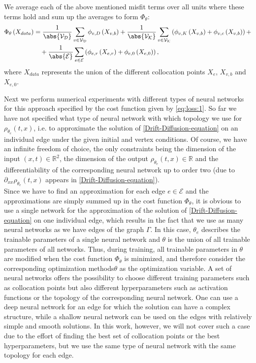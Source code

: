 We average each of the above mentioned misfit terms over all units where these terms hold and sum up the averages to form $\Phi_\theta$:
\begin{align} 
    \label{eq:loss:1}
    \Phi_{\theta} \left( X_{data} \right) & =  \frac{1}{\abs{\mathcal{V}_\mathcal{D}}} \sum_{v \in \mathcal{V}_\mathcal{D}} \phi_{v,D} \left( X_{v,b} \right) + \frac{1}{\abs{\mathcal{V}_\mathcal{K}}} \sum_{v \in \mathcal{V}_\mathcal{K}}  \left(  \phi_{v,K}  \left( X_{v,b} \right) + \phi_{v,c} \left( X_{v,b} \right)  \right) + \\
    & \quad + \frac{1}{\abs{\mathcal{E}}} \sum_{e \in \mathcal{E}}  \left(  \phi_{e,r}  \left( X_{e,r} \right) + \phi_{e,0}  \left( X_{e,0} \right)  \right), 
\end{align}
where $X_{data}$ represents the union of the different collocation points $X_e$, $X_{v,b}$ and $X_{e,0}$. 

Next we perform numerical experiments with different types of neural networks for this approach specified by the cost function given by \cref{eq:loss:1}. So far we have not specified what type of neural network with which topology we use for $\rho_{\theta_e}(t, x)$, i.e. to approximate the solution of \cref{Drift-Diffusion-equation} on an individual edge under the given initial and vertex conditions. Of course, we have an infinite freedom of choice, the only constraints being the dimension of the input $(x,t) \in \mathbb{R}^2$, the dimension of the output $\rho_{\theta_e}(t, x) \in \mathbb{R}$ and the differentiability of the corresponding neural network up to order two (due to $\partial_{xx} \rho_{\theta_e}(t,x)$ appears in \cref{Drift-Diffusion-equation}). \\
Since we have to find an approximation for each edge $e \in \mathcal{E}$ and the approximations are simply summed up in the cost function $\Phi_{\theta}$, it is obvious to use a single network for the approximation of the solution of \cref{Drift-Diffusion-equation} on one individual edge, which results in the fact that we use as many neural networks as we have edges of the graph $\Gamma$. In this case, $\theta_e$ describes the trainable parameters of a single neural network and $\theta$ is the union of all trainable parameters of all networks. Thus, during training, all trainable parameters in $\theta$ are modified when the cost function $\Phi_{\theta}$ is minimized, and therefore consider the corresponding optimization methods$\theta$ as the optimization variable. A set of neural networks offers the possibility to choose different training parameters such as collocation points but also different hyperparameters such as activation functions or the topology of the corresponding neural network. One can use a deep neural network for an edge for which the solution can have a complex structure, while a shallow neural network can be used on the edges with relatively simple and smooth solutions. In this work, however, we will not cover such a case due to the effort of finding the best set of collocation points or the best hyperparameters, but we use the same type of neural network with the same topology for each edge. \\

